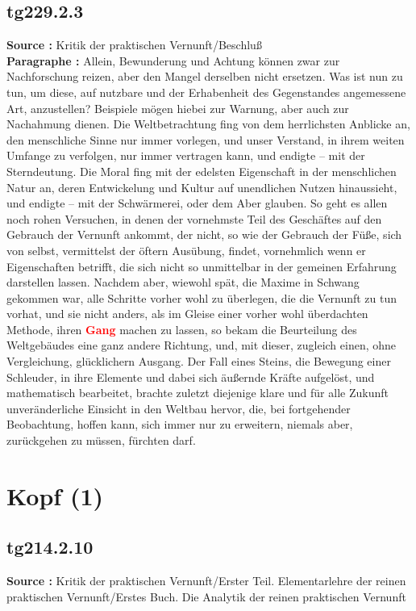 \documentclass[a4paper,12pt,twoside]{book}
\newcommand{\match}[1]{\textcolor{red}{\textbf{#1}}}
\newcommand{\unnumberedsection}[1]{
	\section*{#1}
	\addcontentsline{toc}{section}{#1}
	\markright{#1}
}
\begin{document}
	\subsection*{tg229.2.3} 
	\textbf{Source : }Kritik der praktischen Vernunft/Beschluß\\  
	
	\textbf{Paragraphe : }Allein, Bewunderung und Achtung können zwar zur Nachforschung reizen, aber den Mangel derselben nicht ersetzen.  Was ist nun zu tun, um diese, auf nutzbare und der Erhabenheit des Gegenstandes angemessene Art, anzustellen? Beispiele mögen hiebei zur Warnung, aber auch zur Nachahmung dienen. Die Weltbetrachtung fing von dem herrlichsten Anblicke an, den menschliche Sinne nur immer vorlegen, und unser Verstand, in ihrem weiten Umfange zu verfolgen, nur immer vertragen kann, und endigte – mit der Sterndeutung. Die Moral fing mit der edelsten Eigenschaft in der menschlichen Natur an, deren Entwickelung und Kultur auf unendlichen Nutzen hinaussieht, und endigte – mit der Schwärmerei, oder dem Aber glauben. So geht es allen noch rohen Versuchen, in denen der vornehmste Teil des Geschäftes auf den Gebrauch der Vernunft ankommt, der nicht, so wie der Gebrauch der Füße, sich von selbst, vermittelst der öftern Ausübung, findet, vornehmlich wenn er Eigenschaften betrifft, die sich nicht so unmittelbar in der gemeinen Erfahrung darstellen lassen. Nachdem aber, wiewohl spät, die Maxime in Schwang gekommen war, alle Schritte vorher wohl zu überlegen, die die Vernunft zu tun vorhat, und sie nicht anders, als im Gleise einer vorher wohl überdachten Methode, ihren \match{Gang} machen zu lassen, so bekam die Beurteilung des Weltgebäudes eine ganz andere Richtung, und, mit dieser, zugleich einen, ohne Vergleichung, glücklichern Ausgang. Der Fall eines Steins, die Bewegung einer Schleuder, in ihre Elemente und dabei sich äußernde Kräfte aufgelöst, und mathematisch bearbeitet, brachte zuletzt diejenige klare und für alle Zukunft unveränderliche Einsicht in den Weltbau hervor, die, bei fortgehender Beobachtung, hoffen kann, sich immer nur zu erweitern, niemals aber, zurückgehen zu müssen, fürchten darf. 
	
	\unnumberedsection{Kopf (1)} 
	\subsection*{tg214.2.10} 
	\textbf{Source : }Kritik der praktischen Vernunft/Erster Teil. Elementarlehre der reinen praktischen Vernunft/Erstes Buch. Die Analytik der reinen praktischen Vernunft\\  
	
\end{document}
